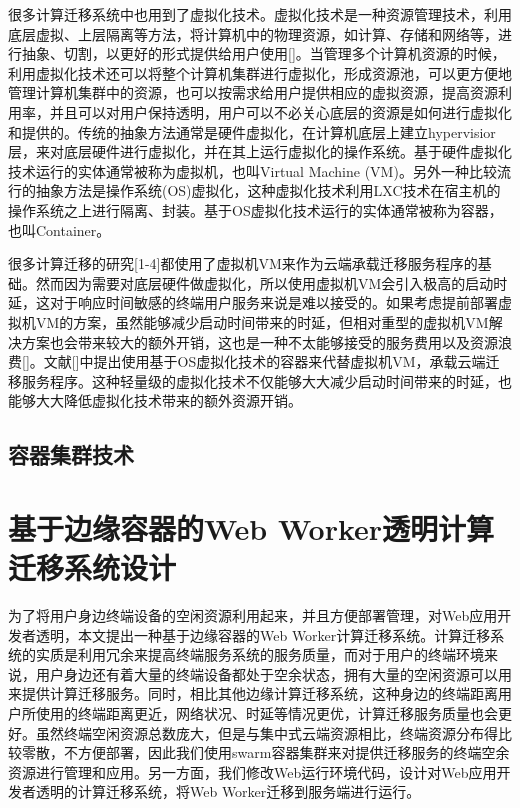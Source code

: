 很多计算迁移系统中也用到了虚拟化技术。虚拟化技术是一种资源管理技术，利用底层虚拟、上层隔离等方法，将计算机中的物理资源，如计算、存储和网络等，进行抽象、切割，以更好的形式提供给用户使用[]。当管理多个计算机资源的时候，利用虚拟化技术还可以将整个计算机集群进行虚拟化，形成资源池，可以更方便地管理计算机集群中的资源，也可以按需求给用户提供相应的虚拟资源，提高资源利用率，并且可以对用户保持透明，用户可以不必关心底层的资源是如何进行虚拟化和提供的。传统的抽象方法通常是硬件虚拟化，在计算机底层上建立hypervisior层，来对底层硬件进行虚拟化，并在其上运行虚拟化的操作系统。基于硬件虚拟化技术运行的实体通常被称为虚拟机，也叫Virtual Machine (VM)。另外一种比较流行的抽象方法是操作系统(OS)虚拟化，这种虚拟化技术利用LXC技术在宿主机的操作系统之上进行隔离、封装。基于OS虚拟化技术运行的实体通常被称为容器，也叫Container。

很多计算迁移的研究[1-4]都使用了虚拟机VM来作为云端承载迁移服务程序的基础。然而因为需要对底层硬件做虚拟化，所以使用虚拟机VM会引入极高的启动时延，这对于响应时间敏感的终端用户服务来说是难以接受的。如果考虑提前部署虚拟机VM的方案，虽然能够减少启动时间带来的时延，但相对重型的虚拟机VM解决方案也会带来较大的额外开销，这也是一种不太能够接受的服务费用以及资源浪费[]。文献[]中提出使用基于OS虚拟化技术的容器来代替虚拟机VM，承载云端迁移服务程序。这种轻量级的虚拟化技术不仅能够大大减少启动时间带来的时延，也能够大大降低虚拟化技术带来的额外资源开销。

\subsection{容器集群技术}
\section{基于边缘容器的Web Worker透明计算迁移系统设计}

为了将用户身边终端设备的空闲资源利用起来，并且方便部署管理，对Web应用开发者透明，本文提出一种基于边缘容器的Web Worker计算迁移系统。计算迁移系统的实质是利用冗余来提高终端服务系统的服务质量，而对于用户的终端环境来说，用户身边还有着大量的终端设备都处于空余状态，拥有大量的空闲资源可以用来提供计算迁移服务。同时，相比其他边缘计算迁移系统，这种身边的终端距离用户所使用的终端距离更近，网络状况、时延等情况更优，计算迁移服务质量也会更好。虽然终端空闲资源总数庞大，但是与集中式云端资源相比，终端资源分布得比较零散，不方便部署，因此我们使用swarm容器集群来对提供迁移服务的终端空余资源进行管理和应用。另一方面，我们修改Web运行环境代码，设计对Web应用开发者透明的计算迁移系统，将Web Worker迁移到服务端进行运行。
